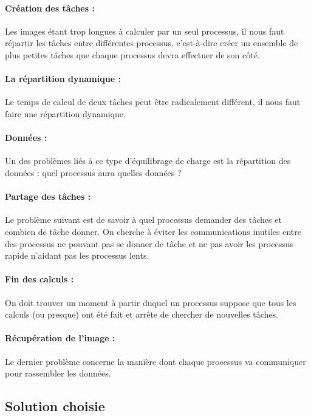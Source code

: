 \documentclass{article}
\begin{document}
\paragraph{Cr\'eation des t\^aches : }
Les images \'etant trop longues \`a calculer par un seul processus, il nous faut r\'epartir les t\^aches entre diff\'erentes processus,
c'est-\`a-dire cr\'eer un ensemble de plus petites t\^aches que chaque processus devra effectuer de son c\^ot\'e. 

\paragraph{La r\'epartition dynamique : }
Le temps de calcul de deux t\^aches peut \^etre radicalement diff\'erent, il nous faut faire une
r\'epartition dynamique.

\paragraph{Données : }
Un des probl\`emes li\'es \`a ce type d'\'equilibrage de charge est la r\'epartition des donn\'ees : quel processus aura quelles donn\'ees ?

\paragraph{Partage des t\^aches : }
Le probl\`eme suivant est de savoir \`a quel processus demander des t\^aches et combien de t\^ache donner.
On cherche \`a \'eviter les communications inutiles entre des processus ne pouvant pas se donner de t\^ache
et ne pas avoir les processus rapide n'aidant pas les processus lents.

\paragraph{Fin des calculs : }
On doit trouver un moment \`a partir duquel un processus suppose que tous les calculs (ou presque) ont \'et\'e fait
et arr\^ete de chercher de nouvelles t\^aches.

\paragraph{Récupération de l'image : }
Le dernier probl\`eme concerne la mani\`ere dont chaque processus va communiquer pour rassembler les donn\'ees. 

\newpage

\subsection{Solution choisie}
\end{document}
